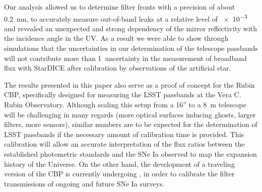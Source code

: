 Our analysis allowed us to determine filter fronts with a precision of
about \SI{0.2}{\nano\meter}, to accurately measure out-of-band leaks at a relative
level of \num{e-3} and revealed an unexpected and strong dependency of
the mirror reflectivity with the incidence angle in the UV. As a
result we were able to show through simulations that the uncertainties in our determination of the
telescope passbands will not contribute more than 1\textperthousand\
uncertainty in the measurement of broadband flux with StarDICE after
calibration by observations of the artificial star. 

The results presented in this paper also serve as a proof of concept for the Rubin CBP, specifically designed for measuring the LSST passbands at the Vera C. Rubin Observatory. Although scaling this setup from a 16'' to a \SI{8}{\meter} telescope will be challenging in many regards (more optical surfaces inducing ghosts, larger filters, more sensors), similar numbers are to be expected for the determination of LSST passbands if the necessary amount of calibration time is provided. This calibration will allow an accurate interpretation of the flux ratios between the established photometric standards and the SNe Ia observed to map the expansion history of the Universe. On the other hand, the development of a traveling version of the CBP is currently undergoing \citep{2024RASTI...3..125S}, in order to calibrate the filter transmissions of ongoing and future SNe Ia surveys.

